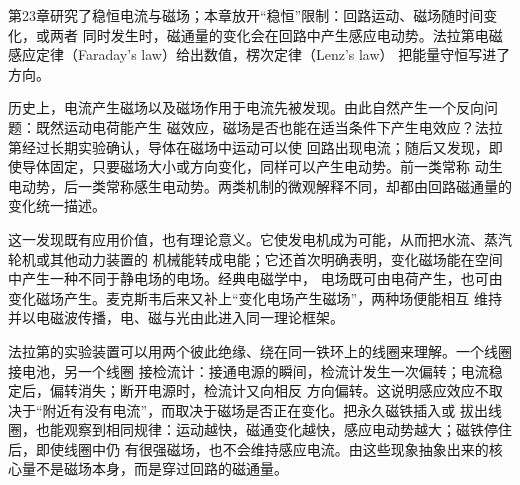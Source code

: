 {\newcommand{\selfFieldLinesDiagram}{%
\begin{center}\begin{tikzpicture}[scale=.66,>=Latex]
 \foreach \xx in {-3.8,3.8}{\begin{scope}[xshift=\xx cm]
  \foreach \sg in {-1,1}{\foreach \a/\b/\h in {.2/2.6/3.8,.6/1.85/2.8}{
   \draw[DeepBlue,thick,postaction={decorate},decoration={markings,mark=at position .5 with {\arrow{Latex}}}]
    ({\sg*\a},0)..controls({\sg*\a},\h)and({\sg*\b},\h)..({\sg*\b},0)
    ..controls({\sg*\b},-\h)and({\sg*\a},-\h)..cycle;}}
  \draw[vector](0,-.8)--(0,3.25)node[above]{$B$};
  \ifdim\xx pt<0pt
   \draw[Ink,thick](0,0)ellipse(1.45 and .38);
   \draw[Ink,->](230:1.45 and .38)arc(230:310:1.45 and .38);
   \node at(0,-3.65){单匝圆电流的自生磁场};
  \else
   \foreach \y in {-1.3,-.975,...,1.3}{\draw[Ink,thick](0,\y)ellipse(1.15 and .25);}
   \node at(0,-3.65){有限长同向绕组的回流场};
  \fi
 \end{scope}}
\end{tikzpicture}\end{center}}


第23章研究了稳恒电流与磁场；本章放开“稳恒”限制：回路运动、磁场随时间变化，或两者
同时发生时，磁通量的变化会在回路中产生感应电动势。法拉第电磁感应定律（Faraday's law）给出数值，楞次定律（Lenz's law）
把能量守恒写进了方向。

历史上，电流产生磁场以及磁场作用于电流先被发现。由此自然产生一个反向问题：既然运动电荷能产生
磁效应，磁场是否也能在适当条件下产生电效应？法拉第经过长期实验确认，导体在磁场中运动可以使
回路出现电流；随后又发现，即使导体固定，只要磁场大小或方向变化，同样可以产生电动势。前一类常称
动生电动势，后一类常称感生电动势。两类机制的微观解释不同，却都由回路磁通量的变化统一描述。

这一发现既有应用价值，也有理论意义。它使发电机成为可能，从而把水流、蒸汽轮机或其他动力装置的
机械能转成电能；它还首次明确表明，变化磁场能在空间中产生一种不同于静电场的电场。经典电磁学中，
电场既可由电荷产生，也可由变化磁场产生。麦克斯韦后来又补上“变化电场产生磁场”，两种场便能相互
维持并以电磁波传播，电、磁与光由此进入同一理论框架。

法拉第的实验装置可以用两个彼此绝缘、绕在同一铁环上的线圈来理解。一个线圈接电池，另一个线圈
接检流计：接通电源的瞬间，检流计发生一次偏转；电流稳定后，偏转消失；断开电源时，检流计又向相反
方向偏转。这说明感应效应不取决于“附近有没有电流”，而取决于磁场是否正在变化。把永久磁铁插入或
拔出线圈，也能观察到相同规律：运动越快，磁通变化越快，感应电动势越大；磁铁停住后，即使线圈中仍
有很强磁场，也不会维持感应电流。由这些现象抽象出来的核心量不是磁场本身，而是穿过回路的磁通量。

}
